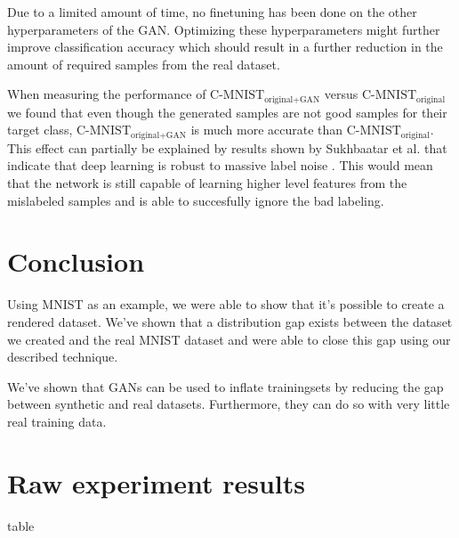 \documentclass[10pt,twocolumn,letterpaper]{article}
\begin{document}
Due to a limited amount of time, no finetuning has been done on the other hyperparameters of the GAN. Optimizing these hyperparameters might further improve classification accuracy which should result in a further reduction in the amount of required samples from the real dataset.

When measuring the performance of $\text{C-MNIST}_\text{original+GAN}$ versus $\text{C-MNIST}_\text{original}$ we found that even though the generated samples are not good samples for their target class, $\text{C-MNIST}_\text{original+GAN}$ is much more accurate than $\text{C-MNIST}_\text{original}$. This effect can partially be explained by results shown by Sukhbaatar et al. that indicate that deep learning is robust to massive label noise \cite{Sukhbaatar2014TrainingCN}. This would mean that the network is still capable of learning higher level features from the mislabeled samples and is able to succesfully ignore the bad labeling.


\section{Conclusion}


Using MNIST as an example, we were able to show that it's possible to create a rendered dataset. We've shown that a distribution gap exists between the dataset we created and the real MNIST dataset and were able to close this gap using our described technique.

We've shown that GANs can be used to inflate trainingsets by reducing the gap between synthetic and real datasets. Furthermore, they can do so with very little real training data.

{\small


}

\onecolumn
\appendix

\section{Raw experiment results}

table
\end{document}
